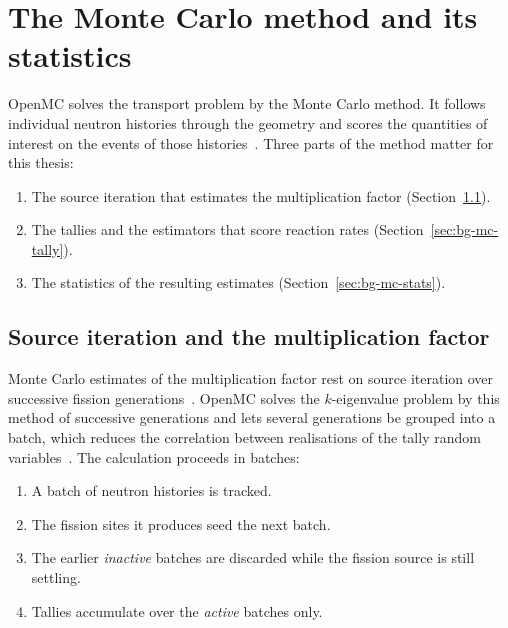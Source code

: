 \section{The Monte Carlo method and its statistics}
\label{sec:bg-mc}

OpenMC solves the transport problem by the Monte Carlo method. It follows
individual neutron histories through the geometry and scores the
quantities of interest on the events of those
histories~\cite{romano_openmc_2015}. Three parts of the method matter
for this thesis:

\begin{enumerate}
  \item The source iteration that estimates the multiplication factor
        (Section~\ref{sec:bg-mc-k}).

  \item The tallies and the estimators that score reaction rates
        (Section~\ref{sec:bg-mc-tally}).

  \item The statistics of the resulting estimates
        (Section~\ref{sec:bg-mc-stats}).
\end{enumerate}

\subsection{Source iteration and the multiplication factor}
\label{sec:bg-mc-k}

Monte Carlo estimates of the multiplication factor rest on source
iteration over successive fission generations~\cite{lux_koblinger_1991}.
OpenMC solves the $k$-eigenvalue problem by this method of successive
generations and lets several generations be grouped into a batch, which
reduces the correlation between realisations of the tally random
variables~\cite{romano_openmc_2015}. The calculation proceeds in
batches:

\begin{enumerate}
  \item A batch of neutron histories is tracked.

  \item The fission sites it produces seed the next batch.

  \item The earlier \emph{inactive} batches are discarded while the
        fission source is still settling.

  \item Tallies accumulate over the \emph{active} batches only.
\end{enumerate}

